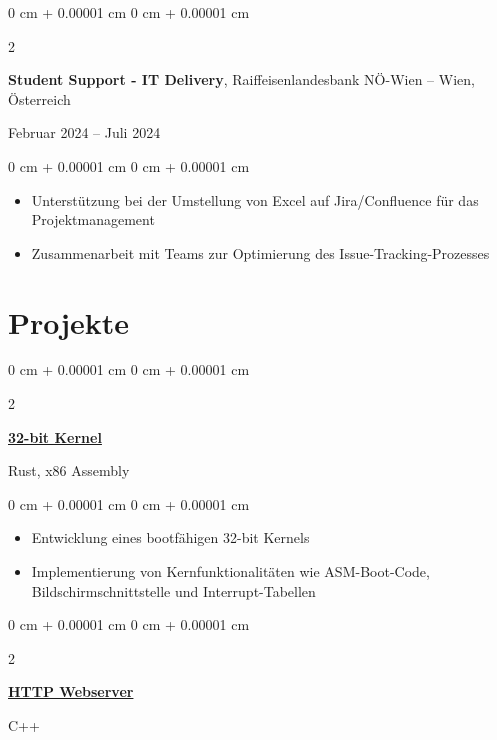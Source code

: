 \documentclass[10pt, letterpaper]{article}
\newenvironment{highlights}{
    \begin{itemize}[
        topsep=0.10 cm,
        parsep=0.10 cm,
        partopsep=0pt,
        itemsep=0pt,
        leftmargin=0 cm + 10pt
    ]
}{
    \end{itemize}
}
\newenvironment{onecolentry}{
    \begin{adjustwidth}{
        0 cm + 0.00001 cm
    }{
        0 cm + 0.00001 cm
    }
}{
    \end{adjustwidth}
}
\newenvironment{twocolentry}[2][]{
    \onecolentry
    \def\secondColumn{#2}
    \setcolumnwidth{\fill, 4.5 cm}
    \begin{paracol}{2}
}{
    \switchcolumn \raggedleft \secondColumn
    \end{paracol}
    \endonecolentry
}
\begin{document}
    \vspace{0.2 cm}

    \begin{twocolentry}
        {Februar 2024 – Juli 2024}
        \textbf{Student Support - IT Delivery}, Raiffeisenlandesbank NÖ-Wien -- Wien, Österreich
    \end{twocolentry}

    \vspace{0.10 cm}

    \begin{onecolentry}
        \begin{highlights}
            \item Unterstützung bei der Umstellung von Excel auf Jira/Confluence für das Projektmanagement
            \item Zusammenarbeit mit Teams zur Optimierung des Issue-Tracking-Prozesses
        \end{highlights}
    \end{onecolentry}

    \section{Projekte}
        
    \begin{twocolentry}
        {Rust, x86 Assembly}
        \href{https://github.com/kentucky-fried-kernel/kfs}{\textbf{32-bit Kernel}}
    \end{twocolentry}

    \vspace{0.10 cm}
    
    \begin{onecolentry}
        \begin{highlights}
            \item Entwicklung eines bootfähigen 32-bit Kernels
            \item Implementierung von Kernfunktionalitäten wie ASM-Boot-Code, Bildschirmschnittstelle und Interrupt-Tabellen
        \end{highlights}
    \end{onecolentry}


    \vspace{0.2 cm}

    \begin{twocolentry}
        {C++}
        \href{https://github.com/winstonallo/webserv}{\textbf{HTTP Webserver}}
    \end{twocolentry}
\end{document}
